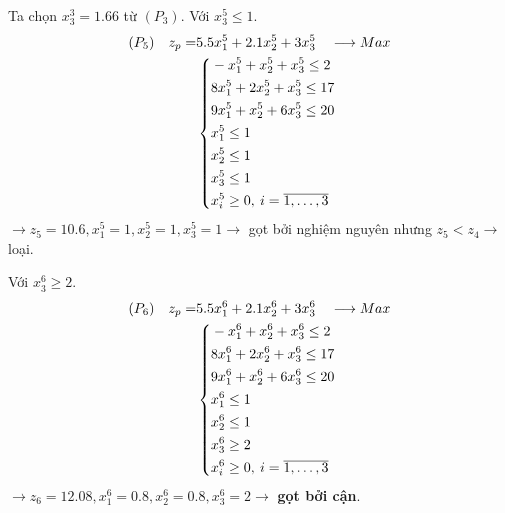 \documentclass[12pt,a4paper]{report}
\begin{document}
    Ta chọn $x^3_3=1.66$ từ $(P_3)$. Với $x^5_3 \leq 1$.
    \begin{equation*}
      \begin{split}
          (P_5) \quad z_p= & 5.5x^5_1 + 2.1x^5_2 + 3x^5_3 \quad \longrightarrow Max \\
          & \left\{\begin{split}
          & -x^5_1 + x^5_2 + x^5_3 \leq 2 \\
          & 8x^5_1 + 2x^5_2 + x^5_3\leq 17 \\
          & 9x^5_1 + x^5_2 + 6x^5_3 \leq 20 \\
          & x^5_1 \leq 1 \\
          & x^5_2 \leq 1 \\
          & x^5_3 \leq 1 \\
          &x^5_i \geq 0 , \: i=\overline{\rm 1, \ldots ,3} \\
          \end{split}\right. \\
      \end{split}
    \end{equation*}
    $\rightarrow z_5=10.6, x^5_1=1, x^5_2=1, x^5_3=1 \rightarrow$ gọt bởi nghiệm nguyên nhưng $z_5<z_4 \rightarrow$ loại.
    
    
    
    Với $x^6_3 \geq 2$.
    \begin{equation*}
      \begin{split}
          (P_6) \quad z_p= & 5.5x^6_1 + 2.1x^6_2 + 3x^6_3 \quad \longrightarrow Max \\
          & \left\{\begin{split}
          & -x^6_1 + x^6_2 + x^6_3 \leq 2 \\
          & 8x^6_1 + 2x^6_2 + x^6_3\leq 17 \\
          & 9x^6_1 + x^6_2 + 6x^6_3 \leq 20 \\
          & x^6_1 \leq 1 \\
          & x^6_2 \leq 1 \\
          & x^6_3 \geq 2 \\
          &x^6_i \geq 0 , \: i=\overline{\rm 1, \ldots ,3} \\
          \end{split}\right. \\
      \end{split}
    \end{equation*}
    $\rightarrow z_6=12.08, x^6_1=0.8, x^6_2=0.8, x^6_3=2 \rightarrow$ \textbf{gọt bởi cận}.
    
\end{document}
